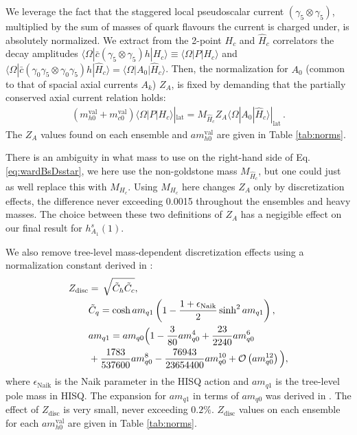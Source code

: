 We leverage the fact that the staggered local pseudoscalar current $(\gamma_5\otimes \gamma_5)$, multiplied by the sum of masses of quark flavours the current is charged under, is absolutely normalized. We extract from the 2-point $H_c$ and $\hat{H}_c$ correlators the decay amplitudes $\langle \Omega | \bar{c} (\gamma_5\otimes \gamma_5) h | H_c \rangle \equiv \langle \Omega | P | H_c \rangle$ and $\langle \Omega | \bar{c} (\gamma_0\gamma_5 \otimes \gamma_0\gamma_5) h | \hat{H}_c \rangle = \langle \Omega | A_0 | \hat{H}_c \rangle$. Then, the normalization for $A_0$ (common to that of spacial axial currents $A_k$) $Z_A$, is fixed by demanding that the partially conserved axial current relation holds:
\begin{align}
  (m^{\text{val}}_{h0} + m^{\text{val}}_{c0}) \langle \Omega | P | H_c \rangle|_{\text{lat}} = M_{\hat{H}_c} Z_A \langle \Omega | A_0 | \hat{H}_c \rangle|_{\text{lat}}\,.
  \label{eq:wardBsDsstar}
\end{align}
The $Z_A$ values found on each ensemble and $am^{\text{val}}_{h0}$ are given in Table \ref{tab:norms}.

There is an ambiguity in what mass to use on the right-hand side of Eq. \eqref{eq:wardBsDsstar}, we here use the non-goldstone mass $M_{\hat{H}_c}$, but one could just as well replace this with $M_{H_c}$. Using $M_{H_c}$ here changes $Z_A$ only by discretization effects, the difference never exceeding 0.0015 throughout the ensembles and heavy masses. The choice between these two definitions of $Z_A$ has a negigible effect on our final result for $h^s_{A_1}(1)$.

We also remove tree-level mass-dependent discretization effects using a normalization constant derived in \cite{Monahan:2012dq,Bazavov:2017lyh}:
\begin{align}
  \label{eq:ZdiscBsDsstar}
  Z_{\text{disc}} &=\,\sqrt{ \tilde{C}_h \tilde{C}_c }, \\
  \nonumber
  &\tilde{C}_q = \cosh am_{q1} \left( 1 - {1+\epsilon_{\text{Naik}}\over 2} \sinh^2 am_{q1} \right), \\ \nonumber
  &am_{q1} = am_{q0} \Big( 1 - {3\over 80}am_{q0}^4 + {23\over 2240}am_{q0}^6 \\ \nonumber
  &+ {1783\over 537600} am_{q0}^8 - {76943\over23654400}am_{q0}^{10} + \mathcal{O}\left( am_{q0}^{12} \right) \Big), \nonumber
\end{align}
where $\epsilon_{\text{Naik}}$ is the Naik parameter in the HISQ action and $am_{q1}$ is the tree-level pole mass in HISQ. The expansion for $am_{q1}$ in terms of $am_{q0}$ was derived in \cite{Follana:2006rc}. The effect of $Z_{\text{disc}}$ is very small, never exceeding $0.2\%$. $Z_{\text{disc}}$ values on each ensemble for each $am^{\text{val}}_{h0}$ are given in Table \ref{tab:norms}.

